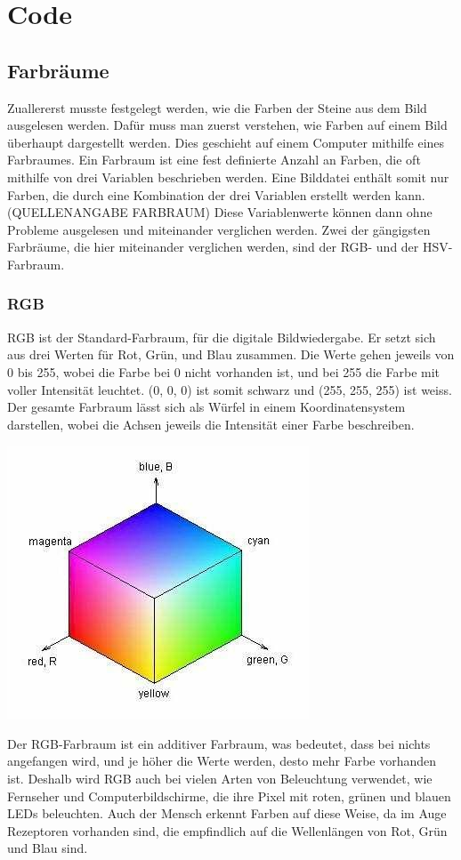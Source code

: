 \documentclass[a4paper, 12pt]{article}
\begin{document}
\section{Code}
\subsection{Farbräume}
Zuallererst musste festgelegt werden, wie die Farben der Steine aus dem Bild ausgelesen werden. Dafür muss man zuerst verstehen, wie Farben auf einem Bild überhaupt dargestellt werden. Dies geschieht auf einem Computer mithilfe eines Farbraumes. Ein Farbraum ist eine fest definierte Anzahl an Farben, die oft mithilfe von drei Variablen beschrieben werden. Eine Bilddatei enthält somit nur Farben, die durch eine Kombination der drei Variablen erstellt werden kann.(QUELLENANGABE FARBRAUM) Diese Variablenwerte können dann ohne Probleme ausgelesen und miteinander verglichen werden. Zwei der gängigsten Farbräume, die hier miteinander verglichen werden, sind der RGB- und der HSV-Farbraum. 
\subsubsection{RGB}
RGB ist der Standard-Farbraum, für die digitale Bildwiedergabe. Er setzt sich aus drei Werten für Rot, Grün, und Blau zusammen. Die Werte gehen jeweils von 0 bis 255, wobei die Farbe bei 0 nicht vorhanden ist, und bei 255 die Farbe mit voller Intensität leuchtet. (0, 0, 0) ist somit schwarz und (255, 255, 255) ist weiss. Der gesamte Farbraum lässt sich als Würfel in einem Koordinatensystem darstellen, wobei die Achsen jeweils die Intensität einer Farbe beschreiben.

\includegraphics[scale=0.5]{RGB_Wuerfel}

 Der RGB-Farbraum ist ein additiver Farbraum, was bedeutet, dass bei nichts angefangen wird, und je höher die Werte werden, desto mehr Farbe vorhanden ist. Deshalb wird RGB auch bei vielen Arten von Beleuchtung verwendet, wie Fernseher und Computerbildschirme, die ihre Pixel mit roten, grünen und blauen LEDs beleuchten. Auch der Mensch erkennt Farben auf diese Weise, da im Auge Rezeptoren vorhanden sind, die empfindlich auf die Wellenlängen von Rot, Grün und Blau sind.
\end{document}
